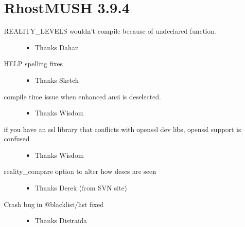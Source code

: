 \documentclass[letterpaper,10pt,english]{sphinxmanual}
\begin{document}
\section{RhostMUSH 3.9.4}
\label{\detokenize{changelog:rhostmush-3-9-4}}\label{\detokenize{changelog:changelog-3-9-4}}\begin{description}
\item[{REALITY\_LEVELS wouldn’t compile because of undeclared function.}] \leavevmode\begin{itemize}
\item {} 
\sphinxAtStartPar
Thanks Dahan

\end{itemize}

\item[{HELP spelling fixes}] \leavevmode\begin{itemize}
\item {} 
\sphinxAtStartPar
Thanks Sketch

\end{itemize}

\item[{compile time issue when enhanced ansi is deselected.}] \leavevmode\begin{itemize}
\item {} 
\sphinxAtStartPar
Thanks Wisdom

\end{itemize}

\item[{if you have an ssl library that conflicts with openssl dev libs, openssl support is confused}] \leavevmode\begin{itemize}
\item {} 
\sphinxAtStartPar
Thanks Wisdom

\end{itemize}

\item[{reality\_compare \textendash{} option to alter how descs are seen}] \leavevmode\begin{itemize}
\item {} 
\sphinxAtStartPar
Thanks Derek (from SVN site)

\end{itemize}

\item[{Crash bug in @blacklist/list fixed}] \leavevmode\begin{itemize}
\item {} 
\sphinxAtStartPar
Thanks Distraida

\end{itemize}


\end{description}
\end{document}
